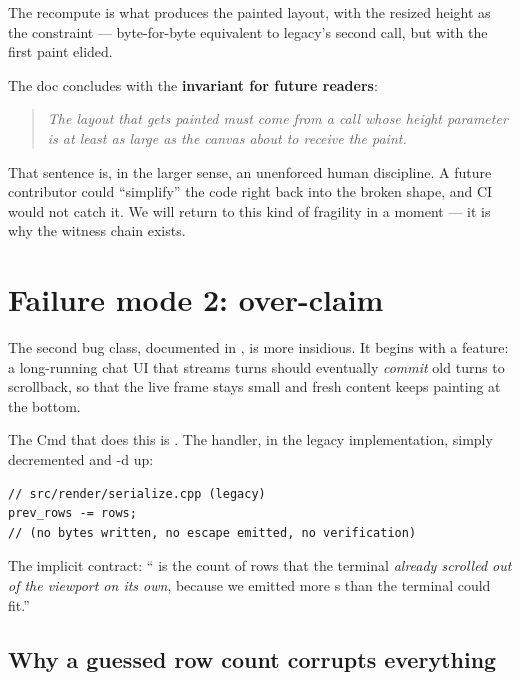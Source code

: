 The recompute is what produces the painted layout, with the resized
height as the constraint --- byte-for-byte equivalent to legacy's
second  call, but with the first paint elided.

The doc concludes with the \textbf{invariant for future readers}:

\begin{quote}\itshape
The layout that gets painted must come from a 
call whose height parameter is at least as large as the canvas about
to receive the paint.
\end{quote}

That sentence is, in the larger sense, an unenforced human
discipline. A future contributor could ``simplify'' the code right
back into the broken shape, and CI would not catch it. We will
return to this kind of fragility in a moment --- it is why the
witness chain exists.

\section{Failure mode 2:  over-claim}

The second bug class, documented in ,
is more insidious. It begins with a feature: a long-running chat UI
that streams turns should eventually \emph{commit} old turns to
scrollback, so that the live frame stays small and fresh content
keeps painting at the bottom.

The Cmd that does this is .
The handler, in the legacy implementation, simply decremented
 and -d  up:

\begin{lstlisting}
// src/render/serialize.cpp (legacy)
prev_rows -= rows;
// (no bytes written, no escape emitted, no verification)
\end{lstlisting}

The implicit contract: `` is the count of rows that the
terminal \emph{already scrolled out of the viewport on its own},
because we emitted more s
than the terminal could fit.''

\subsection{Why a guessed row count corrupts everything}


